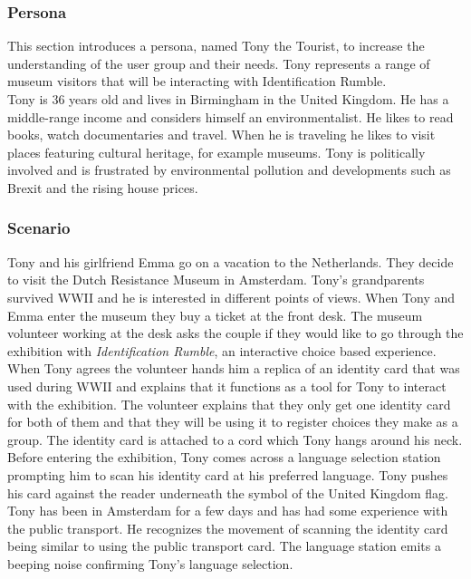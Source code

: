 \subsubsection{Persona} 
This section introduces a persona, named Tony the Tourist, to increase the understanding of the user group and their needs. Tony represents a range of museum visitors that will be interacting with Identification Rumble.\\

Tony is 36 years old and lives in Birmingham in the United Kingdom. He has a middle-range income and considers himself an environmentalist. He likes to read books, watch documentaries and travel. When he is traveling he likes to visit places featuring cultural heritage, for example museums. Tony is politically involved and is frustrated by environmental pollution and developments such as Brexit and the rising house prices.

\subsubsection{Scenario}

Tony and his girlfriend Emma go on a vacation to the Netherlands. They decide to visit the Dutch Resistance Museum in Amsterdam. Tony's grandparents survived WWII and he is interested in different points of views. When Tony and Emma enter the museum they buy a ticket at the front desk. The museum volunteer working at the desk asks the couple if they would like to go through the exhibition with \textit{Identification Rumble}, an interactive choice based experience. When Tony agrees the volunteer hands him a replica of an identity card that was used during WWII and explains that it functions as a tool for Tony to interact with the exhibition. The volunteer explains that they only get one identity card for both of them and that they will be using it to register choices they make as a group. The identity card is attached to a cord which Tony hangs around his neck. Before entering the exhibition, Tony comes across a language selection station prompting him to scan his identity card at his preferred language. Tony pushes his card against the reader underneath the symbol of the United Kingdom flag. Tony has been in Amsterdam for a few days and has had some experience with the public transport. He recognizes the movement of scanning the identity card being similar to using the public transport card. The language station emits a beeping noise confirming Tony's language selection.\\

